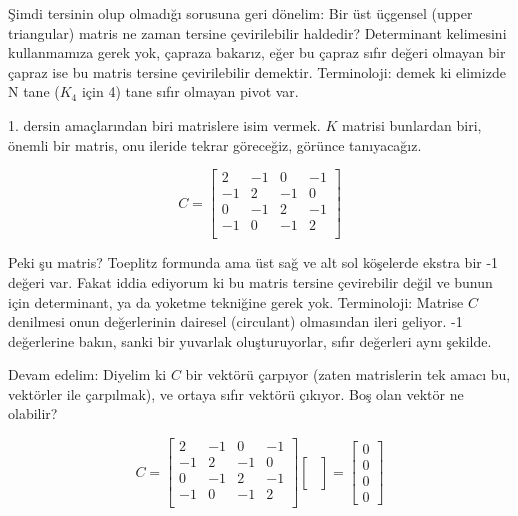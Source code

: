 \documentclass[12pt,fleqn]{article}\usepackage{../../common}
\begin{document}
Şimdi tersinin olup olmadığı sorusuna geri dönelim: Bir üst üçgensel (upper
triangular) matris ne zaman tersine çevirilebilir haldedir? Determinant
kelimesini kullanmamıza gerek yok, çapraza bakarız, eğer bu çapraz sıfır
değeri olmayan bir çapraz ise bu matris tersine çevirilebilir
demektir. Terminoloji: demek ki elimizde N tane ($K_4$ için 4) tane sıfır
olmayan pivot var. 

1. dersin amaçlarından biri matrislere isim vermek. $K$ matrisi bunlardan
biri, önemli bir matris, onu ileride tekrar göreceğiz, görünce
tanıyacağız. 

$$ 
C = 
\left[\begin{array}{rrrr}
2 & -1 & 0 & -1\\
-1 & 2 & -1 & 0\\
0 & -1 & 2 & -1\\
-1 & 0 & -1 & 2\\
\end{array}\right]
$$

Peki şu matris? Toeplitz formunda ama üst sağ ve alt sol köşelerde ekstra
bir -1 değeri var. Fakat iddia ediyorum ki bu matris tersine çevirebilir
değil ve bunun için determinant, ya da yoketme tekniğine gerek
yok. Terminoloji: Matrise $C$ denilmesi onun değerlerinin dairesel
(circulant) olmasından ileri geliyor. -1 değerlerine bakın, sanki bir
yuvarlak oluşturuyorlar, sıfır değerleri aynı şekilde. 

Devam edelim: Diyelim ki $C$ bir vektörü çarpıyor (zaten matrislerin tek amacı
bu, vektörler ile çarpılmak), ve ortaya sıfır vektörü çıkıyor. Boş olan vektör
ne olabilir?

$$ C = 
\left[\begin{array}{rrrr}
2 & -1 & 0 & -1\\
-1 & 2 & -1 & 0\\
0 & -1 & 2 & -1\\
-1 & 0 & -1 & 2\\
\end{array}\right]
\left[\begin{array}{r}
\\
\\
\\
\\
\end{array}\right]
=
\left[\begin{array}{r}
0\\
0\\
0\\
0
\end{array}\right]
 $$
\end{document}
